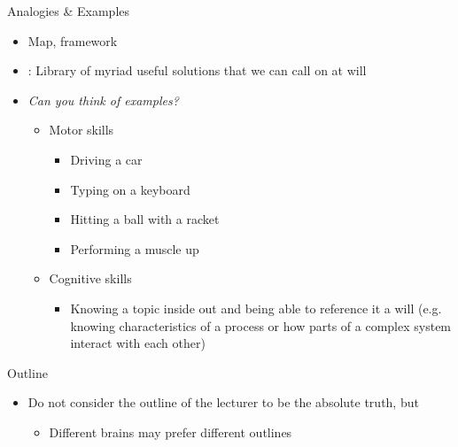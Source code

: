 \documentclass{ercisbeamer}
\begin{document}
\begin{frame}{Analogies \& Examples}
    \begin{tbox}
        \begin{itemize}
            \item Map, framework
            \item {}: Library of myriad useful solutions that we can call on at will
        \end{itemize}
    \end{tbox}

    \vspace{.5em}

    \begin{tbox}
        \begin{itemize}
            \item \emph{Can you think of examples?} \pause
            \begin{itemize}
                \item Motor skills
                \begin{itemize}
                    \item Driving a car
                    \item Typing on a keyboard
                    \item Hitting a ball with a racket
                    \item Performing a muscle up
                \end{itemize}
                \item Cognitive skills
                \begin{itemize}
                    \item Knowing a topic inside out and being able to reference it a will (e.g. knowing characteristics of a process or how parts of a complex system interact with each other)
                \end{itemize}
            \end{itemize}
        \end{itemize}    
    \end{tbox}

\end{frame}

\begin{frame}{Outline}
    \begin{tbox}
        \begin{itemize}
            \item Do not consider the outline of the lecturer to be the absolute truth, but 
            \begin{itemize}
                \item Different brains may prefer different outlines
            \end{itemize}
        \end{itemize}
    \end{tbox}
\end{frame}
\setbgimage{}
\end{document}
